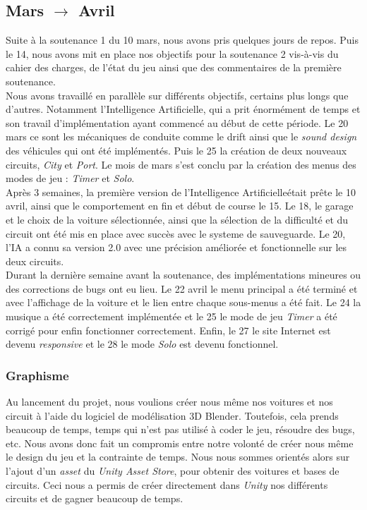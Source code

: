 \documentclass[a4paper,12pt]{article}
\newcommand{\AI}{Intelligence Artificielle}
\begin{document}
        \subsection{Mars $\to$ Avril}
            Suite à la soutenance 1 du 10 mars, nous avons pris quelques jours de repos. Puis le 14, nous
            avons mit en place nos objectifs pour la soutenance 2 vis-à-vis du cahier des charges, de
            l'état du jeu ainsi que des commentaires de la première soutenance.\\
            Nous avons travaillé en parallèle sur différents objectifs, certains plus longs que d'autres.
            Notamment l'\AI, qui a prit énormément de temps et son travail d'implémentation ayant
            commencé au début de cette période. Le 20 mars ce sont les mécaniques de conduite comme le
            drift ainsi que le \textit{sound design} des véhicules qui ont été implémentés. Puis le 25 la
            création de deux nouveaux circuits, \textsl{City} et \textsl{Port}. Le mois de mars s'est
            conclu par la création des menus des modes de jeu : \textsl{Timer} et \textsl{Solo}.\\
            Après 3 semaines, la première version de l'\AI était prête le 10 avril, ainsi que le
            comportement en fin et début de course le 15. Le 18, le garage et le choix de la voiture 
            sélectionnée, ainsi que la sélection de la difficulté et du circuit ont été mis en place avec
            succès avec le systeme de sauveguarde. Le 20, l'IA a connu sa version 2.0 avec une précision améliorée et fonctionnelle sur
            les deux circuits.\\
            Durant la dernière semaine avant la soutenance, des implémentations mineures ou des
            corrections de bugs ont eu lieu. Le 22 avril le menu principal a été terminé et avec
            l'affichage de la voiture et le lien entre chaque sous-menus a été fait. Le 24 la musique a
            été correctement implémentée et le 25 le mode de jeu \textsl{Timer} a été corrigé pour enfin
            fonctionner correctement. Enfin, le 27 le site Internet est devenu \textit{responsive} et le
            28 le mode \textsl{Solo} est devenu fonctionnel.

            \subsubsection{Graphisme}
                Au lancement du projet, nous voulions créer nous même nos voitures et nos circuit à 
                l'aide du logiciel de modélisation 3D Blender. Toutefois, cela prends beaucoup de temps,
                temps qui n'est pas utilisé à coder le jeu, résoudre des bugs, etc. Nous avons donc fait
                un compromis entre notre volonté de créer nous même le design du jeu et la contrainte de
                temps. Nous nous sommes orientés alors sur l'ajout d'un \textit{asset} du \textsl{Unity
                Asset Store}, pour obtenir des voitures et bases de circuits. Ceci nous a permis de
                créer directement dans \textsl{Unity} nos différents circuits et de gagner beaucoup de 
                temps. 
            
\end{document}
